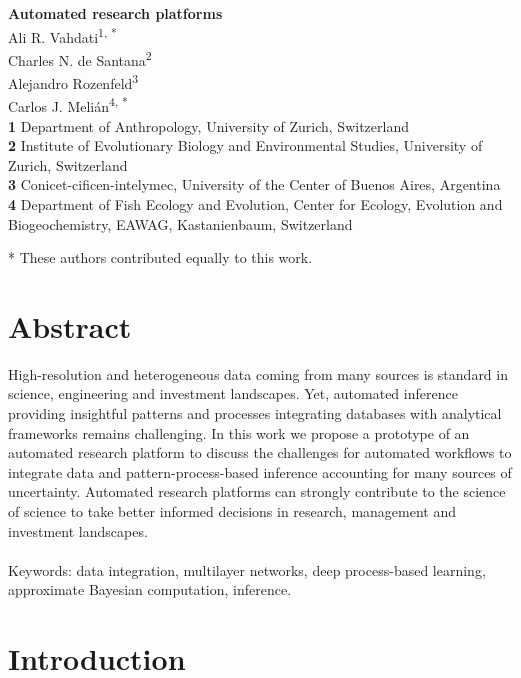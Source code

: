 \documentclass[english,12pt]{article}
\date{}
\begin{document}
\begin{flushleft}
  \textbf{\Large Automated research platforms}\\
Ali R. Vahdati\textsuperscript{1, *}\\
Charles N. de Santana\textsuperscript{2}\\
Alejandro Rozenfeld\textsuperscript{3}\\
Carlos J. Meli\'an\textsuperscript{4, *}\\
  \vspace{0.5cm} 
\textbf{1} Department of Anthropology, University of Zurich, Switzerland\\
\textbf{2} Institute of Evolutionary Biology and Environmental Studies, University of Zurich, Switzerland\\
\textbf{3} Conicet-cificen-intelymec, University of the Center of Buenos Aires, Argentina\\
\textbf{4} Department of Fish Ecology and Evolution, Center for Ecology, Evolution and Biogeochemistry, EAWAG, Kastanienbaum, Switzerland
\\
\bigskip
\end{flushleft}
* These authors contributed equally to this work.\\
\newpage


\tableofcontents
\newpage

\section{Abstract}
High-resolution and heterogeneous data coming from many sources is
standard in science, engineering and investment landscapes. Yet,
automated inference providing insightful patterns and processes
integrating databases with analytical frameworks remains
challenging. In this work we propose a prototype of an automated
research platform to discuss the challenges for automated workflows to
integrate data and pattern-process-based inference accounting for many
sources of uncertainty. Automated research platforms can strongly
contribute to the science of science to take better informed decisions
in research, management and investment landscapes.
\\
\\
Keywords: data integration, multilayer networks, deep process-based
learning, approximate Bayesian computation, inference.
\newpage


\section{Introduction}
\end{document}

